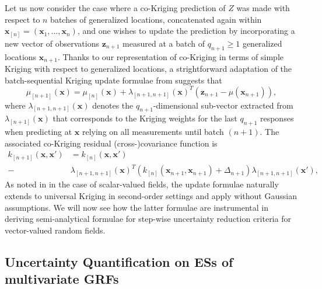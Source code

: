 \documentclass[aoas,preprint]{imsart}
\begin{document}
Let us now consider the case where a co-Kriging prediction of $Z$ was
made with respect to $n$ batches of generalized locations, concatenated again within $\bm{x}_{[n]}=(\bm{x}_1,\dots, \bm{x}_n)$,
and one wishes to update the prediction by incorporating a new vector
of observations $\mathbf{z}_{n+1}$ measured at a batch of
$q_{n+1} \geq 1$ generalized locations $\bm{x}_{n+1}$.
Thanks to our representation of co-Kriging in terms of simple Kriging
with respect to generalized locations, a strightforward adaptation of
the batch-sequential Kriging update formulae from
\citep{Chevalier.etal2013a} suggests that
% 
\begin{equation}\label{eq:meanCoK}
\mu_{[n+1]}(\bm{x})=\mu_{[n]}(\bm{x})+\lambda_{[n+1,n+1]}(\bm{x})^T (\mathbf{z}_{n+1}-\mu(\bm{x}_{n+1})),
\end{equation}
where $\lambda_{[n+1,n+1]}(\bm{x})$ denotes the $q_{n+1}$-dimensional
sub-vector extracted from $\lambda_{[n+1]}(\bm{x})$ that corresponds
to the Kriging weights for the last $q_{n+1}$ responses
when predicting at $\bm{x}$ relying on all measurements until batch $(n+1)$.
The associated co-Kriging residual (cross-)covariance function is
\begin{align}\label{eq:varCoK}
k_{[n+1]}(\bm{x},\bm{x}') & = k_{[n]}(\bm{x},\bm{x}')\\
 \nonumber - & \lambda_{[n+1,n+1]}(\bm{x})^T 
\left(k_{[n]}(\bm{x}_{n+1}, \bm{x}_{n+1})+\Delta_{n+1}\right)
\lambda_{{[n+1,n+1]}}(\bm{x}'),
\end{align}
%
As noted in \citep{Chevalier2015} in the case of scalar-valued fields,
the update formulae naturally extends to universal Kriging in
second-order settings and apply without Gaussian assumptions. We will
now see how the latter formulae are instrumental in deriving
semi-analytical formulae for step-wise uncertainty reduction criteria
for vector-valued random fields.

\subsection{Uncertainty Quantification on ESs of multivariate GRFs}
\label{sec:set_uq}
\end{document}
